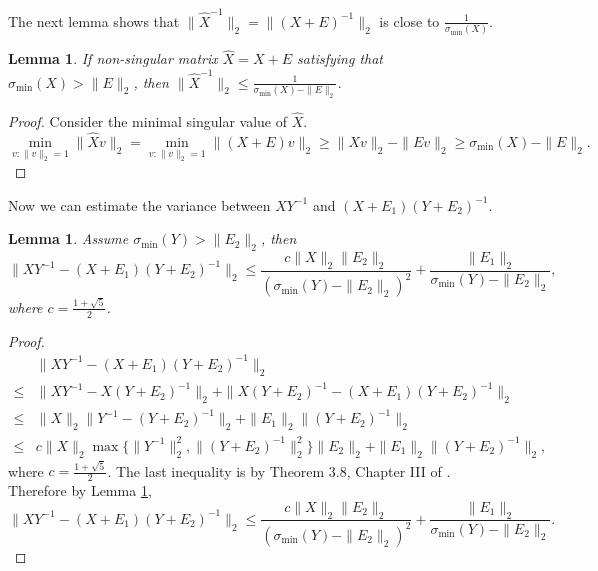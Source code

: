 \documentclass[english]{article} %
\providecommand{\lemmaname}{Lemma}
\theoremstyle{plain}
\newtheorem{lemma}[thm]{\protect\lemmaname}
\theoremstyle{definition}
\theoremstyle{remark}
\begin{document}
The next lemma shows that $\|\widehat{X}^{-1}\|_2 = \|(X+E)^{-1}\|_2$ is close to $\frac{1}{\sigma_{\min}(X)}$.

\begin{lemma}
\label{lem:inversevariation}
If non-singular matrix $\widehat{X} = X+E$ satisfying that $\sigma_{\min}(X)>\|E\|_2$, then  $\|\widehat{X}^{-1}\|_2 \le \frac{1}{\sigma_{\min}(X)-\|E\|_2}$.
\end{lemma} 
\begin{proof}
Consider the minimal singular value of $\widehat{X}$. 
\[
 \min_{v:\|v\|_2=1} \|\widehat{X}v\|_2 = \min_{v:\|v\|_2=1}\|(X+E)v\|_2 \ge \|Xv\|_2 - \|Ev\|_2 \ge \sigma_{\min}(X) - \|E\|_2.
\]
\end{proof}

Now we can estimate the variance between $XY^{-1}$ and $(X+E_1)(Y+E_2)^{-1}$.
\begin{lemma}
\label{lem:Mvariation}
Assume $\sigma_{\min}(Y) > \|E_2\|_2$, then 
\[
\| XY^{-1} - (X+E_1)(Y+E_2)^{-1}\|_2 \le \frac{c\|X\|_2\|E_2\|_2}{(\sigma_{\min}(Y) - \|E_2\|_2)^2}+\frac{\|E_1\|_2}{\sigma_{\min}(Y) - \|E_2\|_2},
\]
where $c = \frac{1+\sqrt{5}}{2}$.
\end{lemma}
\begin{proof}

\begin{align*}
	& \| XY^{-1} - (X+E_1)(Y+E_2)^{-1}\|_2 \\
\le & \| XY^{-1} - X(Y+E_2)^{-1}\|_2 + \| X(Y+E_2)^{-1} - (X+E_1)(Y+E_2)^{-1}\|_2 \\
\le & \|X\|_2\| Y^{-1} - (Y+E_2)^{-1}\|_2 + \| E_1\|_2 \|(Y+E_2)^{-1}\|_2 \\
\le & c \|X\|_2 \max\{\| Y^{-1}\|^2_2 , \|(Y+E_2)^{-1}\|^2_2\} \|E_2\|_2 + \| E_1\|_2 \|(Y+E_2)^{-1}\|_2,
\end{align*}
where $c = \frac{1+\sqrt{5}}{2}$. The last inequality is by Theorem 3.8, Chapter III of \citep*{stewart1990matrix}. Therefore by Lemma \ref{lem:inversevariation},
\[
\| XY^{-1} - (X+E_1)(Y+E_2)^{-1}\|_2 \le \frac{c\|X\|_2\|E_2\|_2}{(\sigma_{\min}(Y) - \|E_2\|_2)^2}+\frac{\|E_1\|_2}{\sigma_{\min}(Y) - \|E_2\|_2}.
\]
\end{proof}
\end{document}
